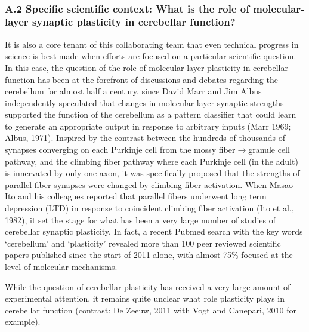 \documentclass[12pt]{article}
\begin{document}
\\

\subsubsection*{A.2 Specific scientific context: What is the role of molecular-layer synaptic plasticity in cerebellar function?}

\noindent It is also a core tenant of this collaborating team that even technical progress in science is best made when efforts are focused on a particular scientific question. In this case, the question of the role of molecular layer plasticity in cerebellar function has been at the forefront of discussions and debates regarding the cerebellum for almost half a century, since David Marr and Jim Albus independently speculated that changes in molecular layer synaptic strengths supported the function of the cerebellum as a pattern classifier that could learn to generate an appropriate output in response to arbitrary inputs (Marr 1969; Albus, 1971). Inspired by the contrast between the hundreds of thousands of synapses converging on each Purkinje cell from the mossy fiber$\rightarrow$granule cell pathway, and the climbing fiber pathway where each Purkinje cell (in the adult) is innervated by only one axon, it was specifically proposed that the strengths of parallel fiber synapses were changed by climbing fiber activation. When Masao Ito and his colleagues reported that parallel fibers underwent long term depression (LTD) in response to coincident climbing fiber activation (Ito et al., 1982), it set the stage for what has been a very large number of studies of cerebellar synaptic plasticity. In fact, a recent Pubmed search with the key words `cerebellum' and `plasticity' revealed more than 100 peer reviewed scientific papers published since the start of 2011 alone, with almost 75\% focused at the level of molecular mechanisms.

While the question of cerebellar plasticity has received a very large amount of experimental attention, it remains quite unclear what role plasticity plays in cerebellar function (contrast: De Zeeuw, 2011 with Vogt and Canepari, 2010 for example).
\end{document}
